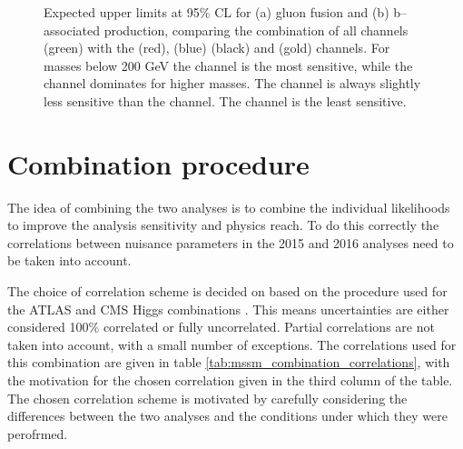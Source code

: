 \begin{figure}[h!]
\begin{center}
\end{center}
\caption{Expected upper limits at 95\% CL for (a) gluon fusion and (b) b--associated production,
comparing the combination of all channels (green) with the \mutau (red), \etau (blue) \tautau (black)
and \emu (gold) channels. For masses below 200 GeV the \mutau channel is the most sensitive,
while the \tautau channel dominates for higher masses. The \etau channel is always
slightly less sensitive than the \mutau channel. The \emu channel is the least sensitive.}
\label{fig:mssm_results_limits_breakdown_hig16006}
\end{figure}
\clearpage


\section{Combination procedure}
\label{sec:mssm_combination_procedure}
The idea of combining the two analyses is to combine the 
individual likelihoods to improve the analysis sensitivity and
physics reach. To do this correctly the correlations between
nuisance parameters in the 2015 and 2016 analyses need to be taken into account.

The choice of correlation scheme is decided on
based on the procedure used for the ATLAS and \ac{CMS}
Higgs combinations \cite{MassComb,CouplComb}. This means
uncertainties are either considered 100\% correlated or fully uncorrelated. Partial
correlations are not taken into account, with a small number of exceptions. The
correlations used for this combination are given in table \ref{tab:mssm_combination_correlations},
with the motivation for the chosen correlation given in the third column of the table.
The chosen correlation scheme is motivated
by carefully considering the differences between the two analyses
and the conditions under which they were perofrmed.

